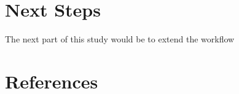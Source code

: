 \documentclass{article}
\begin{document}
\section{Next Steps}

The next part of this study would be to extend the workflow 


\section{References}
\end{document}
